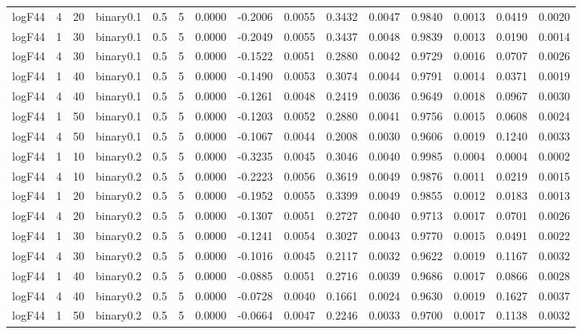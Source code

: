 \begin{longtable}{rrrrrrrrrrrrrrr}
  logF44 & 4 & 20 & binary0.1 & 0.5 & 5 & 0.0000 & -0.2006 & 0.0055 & 0.3432 & 0.0047 & 0.9840 & 0.0013 & 0.0419 & 0.0020 \\ 
  logF44 & 1 & 30 & binary0.1 & 0.5 & 5 & 0.0000 & -0.2049 & 0.0055 & 0.3437 & 0.0048 & 0.9839 & 0.0013 & 0.0190 & 0.0014 \\ 
  logF44 & 4 & 30 & binary0.1 & 0.5 & 5 & 0.0000 & -0.1522 & 0.0051 & 0.2880 & 0.0042 & 0.9729 & 0.0016 & 0.0707 & 0.0026 \\ 
  logF44 & 1 & 40 & binary0.1 & 0.5 & 5 & 0.0000 & -0.1490 & 0.0053 & 0.3074 & 0.0044 & 0.9791 & 0.0014 & 0.0371 & 0.0019 \\ 
  logF44 & 4 & 40 & binary0.1 & 0.5 & 5 & 0.0000 & -0.1261 & 0.0048 & 0.2419 & 0.0036 & 0.9649 & 0.0018 & 0.0967 & 0.0030 \\ 
  logF44 & 1 & 50 & binary0.1 & 0.5 & 5 & 0.0000 & -0.1203 & 0.0052 & 0.2880 & 0.0041 & 0.9756 & 0.0015 & 0.0608 & 0.0024 \\ 
  logF44 & 4 & 50 & binary0.1 & 0.5 & 5 & 0.0000 & -0.1067 & 0.0044 & 0.2008 & 0.0030 & 0.9606 & 0.0019 & 0.1240 & 0.0033 \\ 
  logF44 & 1 & 10 & binary0.2 & 0.5 & 5 & 0.0000 & -0.3235 & 0.0045 & 0.3046 & 0.0040 & 0.9985 & 0.0004 & 0.0004 & 0.0002 \\ 
  logF44 & 4 & 10 & binary0.2 & 0.5 & 5 & 0.0000 & -0.2223 & 0.0056 & 0.3619 & 0.0049 & 0.9876 & 0.0011 & 0.0219 & 0.0015 \\ 
  logF44 & 1 & 20 & binary0.2 & 0.5 & 5 & 0.0000 & -0.1952 & 0.0055 & 0.3399 & 0.0049 & 0.9855 & 0.0012 & 0.0183 & 0.0013 \\ 
  logF44 & 4 & 20 & binary0.2 & 0.5 & 5 & 0.0000 & -0.1307 & 0.0051 & 0.2727 & 0.0040 & 0.9713 & 0.0017 & 0.0701 & 0.0026 \\ 
  logF44 & 1 & 30 & binary0.2 & 0.5 & 5 & 0.0000 & -0.1241 & 0.0054 & 0.3027 & 0.0043 & 0.9770 & 0.0015 & 0.0491 & 0.0022 \\ 
  logF44 & 4 & 30 & binary0.2 & 0.5 & 5 & 0.0000 & -0.1016 & 0.0045 & 0.2117 & 0.0032 & 0.9622 & 0.0019 & 0.1167 & 0.0032 \\ 
  logF44 & 1 & 40 & binary0.2 & 0.5 & 5 & 0.0000 & -0.0885 & 0.0051 & 0.2716 & 0.0039 & 0.9686 & 0.0017 & 0.0866 & 0.0028 \\ 
  logF44 & 4 & 40 & binary0.2 & 0.5 & 5 & 0.0000 & -0.0728 & 0.0040 & 0.1661 & 0.0024 & 0.9630 & 0.0019 & 0.1627 & 0.0037 \\ 
  logF44 & 1 & 50 & binary0.2 & 0.5 & 5 & 0.0000 & -0.0664 & 0.0047 & 0.2246 & 0.0033 & 0.9700 & 0.0017 & 0.1138 & 0.0032 \\ 

\end{longtable}

